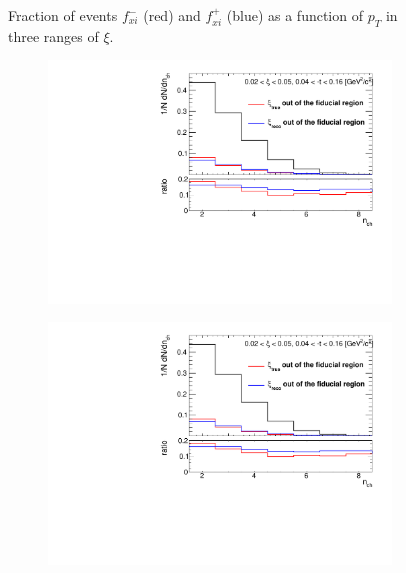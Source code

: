 \begin{figure}[h!]
\begin{subfigure}{.49\textwidth}
	\end{subfigure}
	\begin{minipage}{.49\textwidth}
		\caption[Fraction of events $f_{xi}^-$ and $f_{xi}^+$ as a function of $p_T$ in three ranges of $\xi$]{Fraction of events $f_{xi}^-$ (red) and $f_{xi}^+$ (blue) as a function of $p_T$ in three ranges of $\xi$.}
		\label{fig:xi_correction_pt}
	\end{minipage}
	
\end{figure}

\begin{figure}[h!]
	\centering
	\begin{subfigure}{.49\textwidth}
		\includegraphics[width=\textwidth,page=7]{chapters/chrgSTAR/img/xiMigration/xi.pdf}
	\end{subfigure}
	\begin{subfigure}{.49\textwidth}
		\includegraphics[width=\textwidth,page=8]{chapters/chrgSTAR/img/xiMigration/xi.pdf}

\end{subfigure}
\end{figure}
